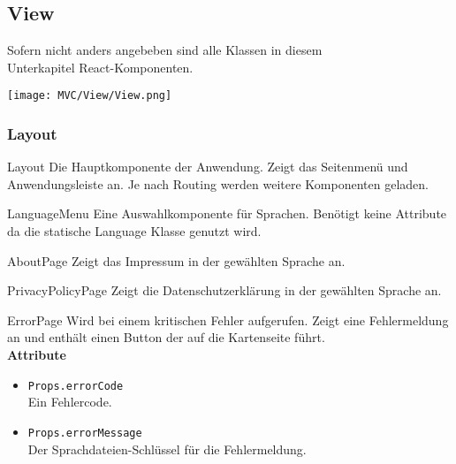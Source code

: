 \newpage
\subsection{View}
Sofern nicht anders angebeben sind alle Klassen in diesem 
\\Unterkapitel React-Komponenten.

\begin{landscape}
    \texttt{[image: MVC/View/View.png]}
\end{landscape}


\subsubsection{Layout}
\begin{Class}{Layout}
    Die Hauptkomponente der Anwendung. Zeigt das Seitenmenü und Anwendungsleiste an.
    Je nach Routing werden weitere Komponenten geladen.
\end{Class}

\begin{Class}{LanguageMenu}
    Eine Auswahlkomponente für Sprachen.
    Benötigt keine Attribute da die statische Language Klasse genutzt wird.
\end{Class}

\begin{Class}{AboutPage}
    Zeigt das Impressum in der gewählten Sprache an.
\end{Class}

\begin{Class}{PrivacyPolicyPage}
    Zeigt die Datenschutzerklärung in der gewählten Sprache an.
\end{Class}

\begin{Class}{ErrorPage}
    Wird bei einem kritischen Fehler aufgerufen.
    Zeigt eine Fehlermeldung an und enthält einen Button der auf die Kartenseite führt.
    \bigskip\\
    \textbf{Attribute}
    \begin{itemize}
        \item \texttt{Props.errorCode}
        \\ Ein Fehlercode.
        \item \texttt{Props.errorMessage}
        \\ Der Sprachdateien-Schlüssel für die Fehlermeldung.
    \end{itemize}
\end{Class}

